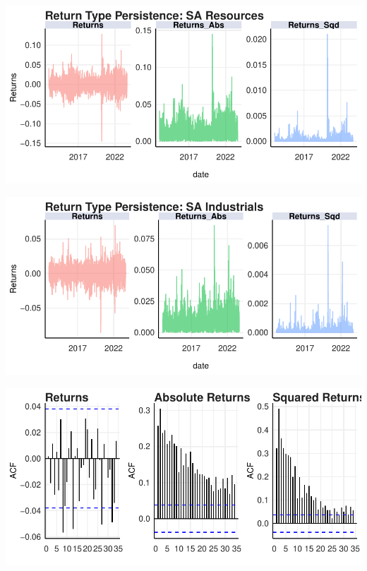\documentclass[11pt,preprint, authoryear]{elsarticle}
\let\origfigure\figure
\let\endorigfigure\endfigure
\renewenvironment{figure}[1][2] {
    \expandafter\origfigure\expandafter[H]
} {
    \endorigfigure
}
\numberwithin{equation}{section}
\numberwithin{figure}{section}
\numberwithin{table}{section}
\begin{document}
\begin{figure}[H]

{\centering \includegraphics{WriteUp_files/figure-latex/FigureA2-1} 

}

\caption{Return Persistence: Resources \label{FigureA2}}\label{fig:FigureA2}
\end{figure}

\begin{figure}[H]

{\centering \includegraphics{WriteUp_files/figure-latex/FigureA3-1} 

}

\caption{Return Persistence: Industrials \label{FigureA3}}\label{fig:FigureA3}
\end{figure}

\begin{figure}[H]

{\centering \includegraphics{WriteUp_files/figure-latex/FigureA4-1} 

}

\caption{Autocorrelation Functions: Financials \label{FigureA4}}\label{fig:FigureA4}
\end{figure}
\end{document}
